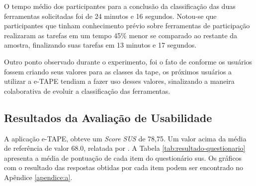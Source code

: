 \par
O tempo médio dos participantes para a conclusão da classificação das duas ferramentas solicitadas foi de 24 minutos e 16 segundos. 
Notou-se que participantes que tinham conhecimento prévio sobre ferramentas de participação realizaram 
as tarefas em um tempo 45\% menor se comparado ao restante da amostra, finalizando suas tarefas em 13 minutos e 17 segundos.

\par 
Outro ponto observado durante o experimento, foi o fato de conforme os usuários fossem criando seus valores para as classes da \acrshort{tape},
os próximos usuários a utilizar a e-TAPE tendiam a fazer uso desses valores, sinalizando a maneira colaborativa de evoluir a classificação das ferramentas.

\subsection{Resultados da Avaliação de Usabilidade}
\label{subsec:resultados-sus}
A aplicação e-TAPE, obteve um \textit{Score SUS} de 78,75. Um valor acima da média de referência de valor 68.0, relatada por .
A Tabela \ref{tab:resultado-questionario} apresenta a média de pontuação de cada item do questionário \acrshort{sus}.
Os gráficos com o resultado das respostas obtidas por cada item podem ser encontrado no Apêndice \ref{apendice:a}.

